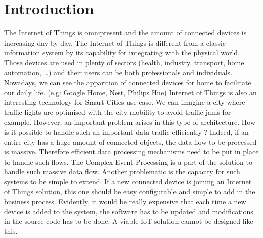\documentclass[11pt]{article}
\begin{document}

\section{Introduction}

The Internet of Things is omnipresent and the amount of connected devices is increasing day by day. The Internet of Things is different from a classic information system by its capability for integrating with the physical world. Those devices are used in plenty of sectors (health, industry, transport, home automation, \ldots) and their users can be both professionals and individuals. Nowadays, we can see the apparition of connected devices for home to facilitate our daily life. (e.g: Google Home, Nest, Philips Hue) Internet of Things is also an interesting technology for Smart Cities use case. We can imagine a city where traffic lights are optimised with the city mobility to avoid traffic jams for example. However, an important problem arises in this type of architecture. How is it possible to handle such an important data traffic efficiently ? Indeed, if an entire city has a huge amount of connected objects, the data flow to be processed is massive. Therefore efficient data processing mechanisms need to be put in place to handle such flows.
\newline
\newline
The Complex Event Processing is a part of the solution to handle such massive data flow. Another problematic is the capacity for such systems to be simple to extend. If a new connected device is joining an Internet of Things solution, this one should be easy configurable and simple to add in the business process. Evidently, it would be really expensive that each time a new device is added to the system, the software has to be updated and modifications in the source code has to be done. A viable IoT solution cannot be designed like this. 
\newline
\newline
\end{document}
